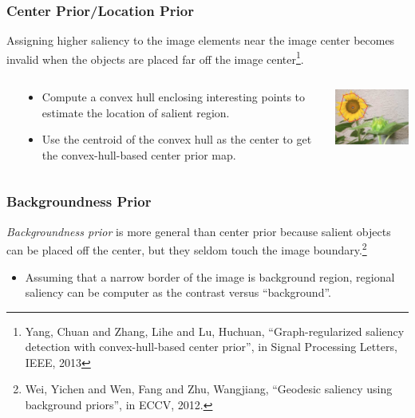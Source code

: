 \documentclass[notheorems,serif,table,compress]{beamer}  %
\begin{document}
\begin{frame}
\frametitle{Center Prior/Location Prior}
Assigning higher saliency to the image elements near the image center becomes invalid when the objects are placed far off the image center\footnote{Yang, Chuan and Zhang, Lihe and Lu, Huchuan, ``Graph-regularized saliency detection with convex-hull-based center prior'', in Signal Processing Letters, IEEE, 2013}.
\begin{columns}
\begin{column}{\leftmargini}
\end{column}
\begin{column}{0.5\linewidth}
\begin{itemize}
\item Compute a convex hull enclosing interesting points to estimate the location of salient region.
\item Use the centroid of the convex hull as the center to get the convex-hull-based center prior map.
\end{itemize}
\end{column}
\begin{column}{0.5\linewidth}
\centering\includegraphics[width=4cm]{convexHull}
\end{column}
\end{columns}\vspace{1ex}
\end{frame}


\begin{frame}
\frametitle{Backgroundness Prior}
{\color{blue}\emph{Backgroundness prior}} is more general than center prior because salient objects can be placed off the center, but they seldom touch the image boundary.\footnote{Wei, Yichen and Wen, Fang and Zhu, Wangjiang, ``Geodesic saliency using background priors'', in ECCV, 2012.}
\begin{itemize}
\item Assuming that a narrow border of the image is background region, regional saliency can be computer as the contrast versus ``background''.
\end{itemize}
\vspace{0.3in}
\end{frame}
\end{document}
